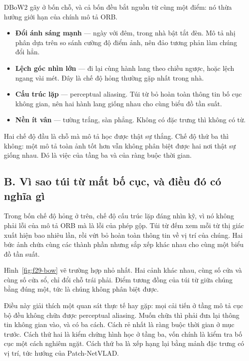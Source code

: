 \documentclass[../../deep_learning.tex]{subfiles}
\begin{document}
DBoW2 gãy ở bốn chỗ, và cả bốn đều bắt nguồn từ cùng một điểm: nó thừa hưởng giới hạn của chính mô tả ORB.

\begin{itemize}
\item \textbf{Đổi ánh sáng mạnh} --- ngày với đêm, trong nhà bật tắt đèn. Mô tả nhị phân dựa trên so sánh cường độ điểm ảnh, nên đảo tương phản làm chúng đổi hẳn.
\item \textbf{Lệch góc nhìn lớn} --- đi lại cùng hành lang theo chiều ngược, hoặc lệch ngang vài mét. Đây là chế độ hỏng thường gặp nhất trong nhà.
\item \textbf{Cấu trúc lặp} --- perceptual aliasing. Túi từ bỏ hoàn toàn thông tin bố cục không gian, nên hai hành lang giống nhau cho cùng biểu đồ tần suất.
\item \textbf{Nền ít vân} --- tường trắng, sàn phẳng. Không có đặc trưng thì không có từ.
\end{itemize}

Hai chế độ đầu là chỗ mà mô tả học được thật sự thắng. Chế độ thứ ba thì không: một mô tả toàn ảnh tốt hơn vẫn không phân biệt được hai nơi thật sự giống nhau. Đó là việc của tầng ba và của ràng buộc thời gian.

\subsection{B. Vì sao túi từ mất bố cục, và điều đó có nghĩa gì}
Trong bốn chế độ hỏng ở trên, chế độ cấu trúc lặp đáng nhìn kỹ, vì nó không phải lỗi của mô tả ORB mà là lỗi của phép gộp. Túi từ đếm xem mỗi từ thị giác xuất hiện bao nhiêu lần, rồi vứt bỏ hoàn toàn thông tin về vị trí của chúng. Hai bức ảnh chứa cùng các thành phần nhưng sắp xếp khác nhau cho cùng một biểu đồ tần suất.

Hình~\ref{fig:f29-bow} vẽ trường hợp nhỏ nhất. Hai cảnh khác nhau, cùng số cửa và cùng số cửa sổ, chỉ đổi chỗ trái phải. Điểm tương đồng của túi từ giữa chúng bằng đúng một, tức là chúng không phân biệt được.

Điều này giải thích một quan sát thực tế hay gặp: mọi cải tiến ở tầng mô tả cục bộ đều không chữa được perceptual aliasing. Muốn chữa thì phải đưa lại thông tin không gian vào, và có ba cách. Cách rẻ nhất là ràng buộc thời gian ở mục trước. Cách thứ hai là kiểm chứng hình học ở tầng ba, vốn chính là kiểm tra bố cục một cách nghiêm ngặt. Cách thứ ba là xếp hạng lại bằng mảnh đặc trưng có vị trí, tức hướng của Patch-NetVLAD.
\end{document}
